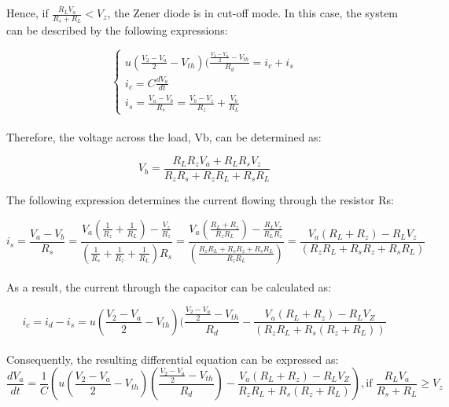Hence, if $\frac{R_LV_a}{R_s+R_L}<V_z$, the Zener diode is in cut-off mode. In this case, the system can be described by the following expressions:

\begin{equation}
    \begin{cases}
        u(\frac{V_2-V_a}{2}-V_{th})(\frac{\frac{V_2-V_a}{2}-V_{th}}{R_d}=i_c+i_s\\
        i_c=C\frac{dV_a}{dt}\\
        i_s=\frac{V_a-V_b}{R_s}=\frac{V_b-V_z}{R_z}+\frac{V_b}{R_L}
    \end{cases}
\end{equation}\\

Therefore, the voltage across the load, Vb, can be determined as:

\begin{equation}
    V_b=\frac{R_LR_zV_a+R_LR_sV_z}{R_zR_s+R_zR_L+R_sR_L}
\end{equation}

The following expression determines the current flowing through the resistor Rs:

\begin{equation}
    i_s=\frac{V_a-V_b}{R_s}=\frac{V_a(\frac{1}{R_z}+\frac{1}{R_L})-\frac{V_z}{R_z}}{(\frac{1}{R_s}+\frac{1}{R_z}+\frac{1}{R_L})R_s}=\frac{V_a(\frac{R_L+R_z}{R_zR_L})-\frac{R_LV_z}{R_LR_z}}{(\frac{R_zR_L+R_sR_z+R_sR_L}{R_zR_L})}=\frac{V_a(R_L+R_z)-R_LV_z}{(R_zR_L+R_sR_z+R_sR_L)}
\end{equation}\\

As a result, the current through the capacitor can be calculated as:

\begin{equation}
    i_c=i_d-i_s=u(\frac{V_2-V_a}{2}-V_{th})(\frac{\frac{V_2-V_a}{2}-V_{th}}{R_d}-\frac{V_a(R_L+R_z)-R_LV_Z}{(R_zR_L+R_s(R_z+R_L))}
\end{equation}\\

Consequently, the resulting differential equation can be expressed as:\\

\begin{equation}
    \frac{dV_a}{dt}=\frac{1}{C}\left(u\left(\frac{V_2-V_a}{2}-V_{th}\right)\left(\frac{\frac{V_2-V_a}{2}-V_{th}}{R_d}\right)-\frac{V_a(R_L+R_z)-R_LV_Z}{R_zR_L+R_s(R_z+R_L)}\right), \text{if } \frac{R_LV_a}{R_s+R_L} \geq V_z
\end{equation}\\

